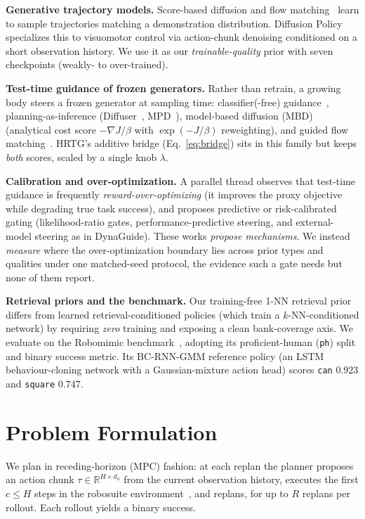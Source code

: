\documentclass[letterpaper, 10 pt, conference]{ieeeconf}
\begin{document}
\textbf{Generative trajectory models.} Score-based diffusion
\cite{ho2020ddpm,song2021score} and flow matching~\cite{rectflow,
lipman2023flow} learn to sample trajectories matching a demonstration
distribution. Diffusion Policy~\cite{dp} specializes this to visuomotor
control via action-chunk denoising conditioned on a short observation
history. We use it as our \emph{trainable-quality} prior with seven
checkpoints (weakly- to over-trained).

\textbf{Test-time guidance of frozen generators.} Rather than retrain, a
growing body steers a frozen generator at sampling time: classifier(-free)
guidance~\cite{dhariwal2021diffusion}, planning-as-inference
(Diffuser~\cite{janner2022}, MPD~\cite{carvalho2023mpd}), model-based
diffusion (MBD)~\cite{mbd} (analytical cost score $-\nabla J/\beta$ with
$\exp(-J/\beta)$ reweighting), and guided flow matching~\cite{ocflow}.
HRTG's additive bridge (Eq.~\ref{eq:bridge}) sits in this family but keeps
\emph{both} scores, scaled by a single knob $\lambda$.

\textbf{Calibration and over-optimization.} A parallel thread observes
that test-time guidance is frequently \emph{reward-over-optimizing} (it
improves the proxy objective while degrading true task success), and
proposes predictive or risk-calibrated gating (likelihood-ratio gates,
performance-predictive steering, and external-model steering as in
DynaGuide). These works \emph{propose mechanisms}. We instead
\emph{measure} where the over-optimization boundary lies across prior types
and qualities under one matched-seed protocol, the evidence such a gate
needs but none of them report.

\textbf{Retrieval priors and the benchmark.} Our training-free 1-NN
retrieval prior differs from learned retrieval-conditioned policies (which
train a $k$-NN-conditioned network) by requiring \emph{zero} training and
exposing a clean bank-coverage axis. We evaluate on the Robomimic
benchmark~\cite{robomimic}, adopting its proficient-human (\texttt{ph})
split and binary success metric. Its BC-RNN-GMM reference policy (an LSTM behaviour-cloning network with a
Gaussian-mixture action head) scores \texttt{can} $0.923$ and
\texttt{square} $0.747$.

\section{Problem Formulation}

We plan in receding-horizon (MPC) fashion: at each replan the planner
proposes an action chunk $\tau\!\in\!\mathbb{R}^{H\times d_a}$ from the
current observation history, executes the first $c\!\le\!H$ steps in the
robosuite environment~\cite{robosuite}, and replans, for up to $R$ replans per rollout.
Each rollout yields a binary success.
\end{document}

